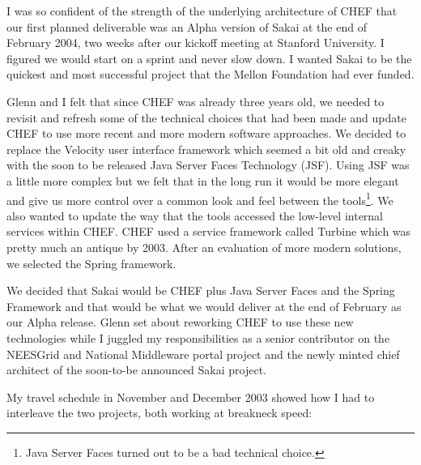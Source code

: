 \documentclass[12pt]{book}
\begin{document}
I was so confident of the strength of
the underlying architecture of CHEF that our first planned deliverable was an Alpha
version of Sakai at the end of February 2004, two weeks after our kickoff meeting at
Stanford University.  I figured we would start on a sprint and never slow down.
I wanted Sakai to be the quickest and most successful project that the Mellon
Foundation had ever funded.

Glenn and I felt that since CHEF was already three years old, we needed to revisit
and refresh some of the technical choices that had been made and update CHEF to
use more recent and more modern software approaches.  We decided to replace the
Velocity user interface framework which seemed a bit old and creaky with the soon
to be released Java Server Faces Technology (JSF).  Using JSF was a little more complex
but we felt that in the long run it would be more elegant and give us more control
over a common look and feel between the tools\footnote{Java Server Faces turned out to be
a bad technical choice.}.  We also wanted to update the way
that the tools accessed the low-level internal services within CHEF.   CHEF used
a service framework called Turbine which was pretty much an antique by 2003.
After an evaluation of more modern solutions, we selected the Spring framework.

We decided that Sakai would be CHEF plus Java Server Faces and the Spring Framework
and that would be what we would deliver at the end of February as our Alpha release.
Glenn set about reworking CHEF to use these new technologies while I juggled
my responsibilities as a senior contributor on the NEESGrid and National
Middleware portal project and the newly minted chief architect of the
soon-to-be announced Sakai project.

My travel schedule in November and December 2003 showed how I had to interleave
the two projects, both working at breakneck speed:
\end{document}
